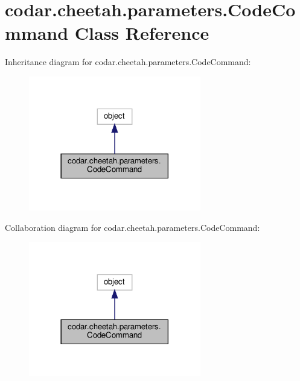 \hypertarget{classcodar_1_1cheetah_1_1parameters_1_1_code_command}{}\section{codar.\+cheetah.\+parameters.\+Code\+Command Class Reference}
\label{classcodar_1_1cheetah_1_1parameters_1_1_code_command}


Inheritance diagram for codar.\+cheetah.\+parameters.\+Code\+Command\+:
\nopagebreak
\begin{figure}[H]
\begin{center}
\leavevmode
\includegraphics[width=213pt]{classcodar_1_1cheetah_1_1parameters_1_1_code_command__inherit__graph}
\end{center}
\end{figure}


Collaboration diagram for codar.\+cheetah.\+parameters.\+Code\+Command\+:
\nopagebreak
\begin{figure}[H]
\begin{center}
\leavevmode
\includegraphics[width=213pt]{classcodar_1_1cheetah_1_1parameters_1_1_code_command__coll__graph}
\end{center}
\end{figure}
